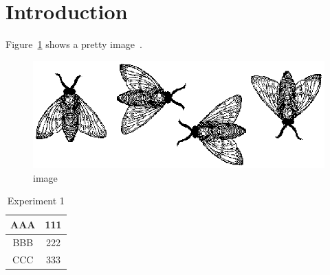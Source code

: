 \section{Introduction} \label{sec:introduction}

Figure~\ref{fig:flies} shows a pretty image~\cite{bowman:reasoning}.


\begin{figure}[!h]
\centering
\includegraphics[width=\shortfigwidth]{graphics/flies.eps}
\caption{image} \label{fig:flies}
\end{figure}



\begin{table}[!h]
\centering
\caption{Experiment 1}
\begin{tabular}{ | c | c | }
\hline
AAA & 111 \\
\hline
BBB & 222 \\
CCC & 333 \\
\hline
\end{tabular}
\label{table:exp1}
\end{table}

